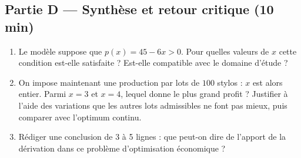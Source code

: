 
\bigskip

\subsection*{Partie D — Synthèse et retour critique (10 min)}

\begin{enumerate}[resume]
  \item Le modèle suppose que $p(x) = 45 - 6x > 0$. Pour quelles valeurs de $x$ cette condition est-elle satisfaite ? Est-elle compatible avec le domaine d'étude ?
  \item On impose maintenant une production par lots de $100$ stylos : $x$ est alors entier. Parmi $x = 3$ et $x = 4$, lequel donne le plus grand profit ? Justifier à l'aide des variations que les autres lots admissibles ne font pas mieux, puis comparer avec l'optimum continu.
  \item Rédiger une conclusion de 3 à 5 lignes : que peut-on dire de l'apport de la dérivation dans ce problème d'optimisation économique ?
\end{enumerate}


